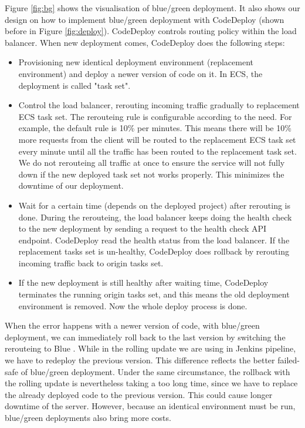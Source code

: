 \par
Figure \ref{fig:bg} shows the visualisation of blue/green deployment. It also shows our design on how to implement blue/green deployment with CodeDeploy (shown before in Figure \ref{fig:deploy}). CodeDeploy controls routing policy within the load balancer. When new deployment comes, CodeDeploy does the following steps:
\begin{itemize}
 \item Provisioning new identical deployment environment (replacement environment) and deploy a newer version of code on it. In ECS, the deployment is called "task set".
 \item Control the load balancer, rerouting incoming traffic gradually to replacement ECS task set. The rerouteing rule is configurable according to the need. For example, the default rule is 10\% per minutes. This means there will be 10\% more requests from the client will be routed to the replacement ECS task set every minute until all the traffic has been routed to the replacement task set. We do not rerouteing all traffic at once to ensure the service will not fully down if the new deployed task set not works properly. This minimizes the downtime of our deployment.
 \item Wait for a certain time (depends on the deployed project) after rerouting is done. During the rerouteing, the load balancer keeps doing the health check to the new deployment by sending a request to the health check API endpoint. CodeDeploy read the health status from the load balancer. If the replacement tasks set is un-healthy, CodeDeploy does rollback by rerouting incoming traffic back to origin tasks set.
 \item If the new deployment is still healthy after waiting time, CodeDeploy terminates the running origin tasks set, and this means the old deployment environment is removed. Now the whole deploy process is done.
\end{itemize}
 When the error happens with a newer version of code, with blue/green deployment, we can immediately roll back to the last version by switching the rerouteing to Blue \cite{UsingBlu65:online}. While in the rolling update we are using in Jenkins pipeline, we have to redeploy the previous version. This difference reflects the better failed-safe of blue/green deployment. Under the same circumstance, the rollback with the rolling update is nevertheless taking a too long time, since we have to replace the already deployed code to the previous version. This could cause longer downtime of the server. However, because an identical environment must be run, blue/green deployments also bring more costs.
